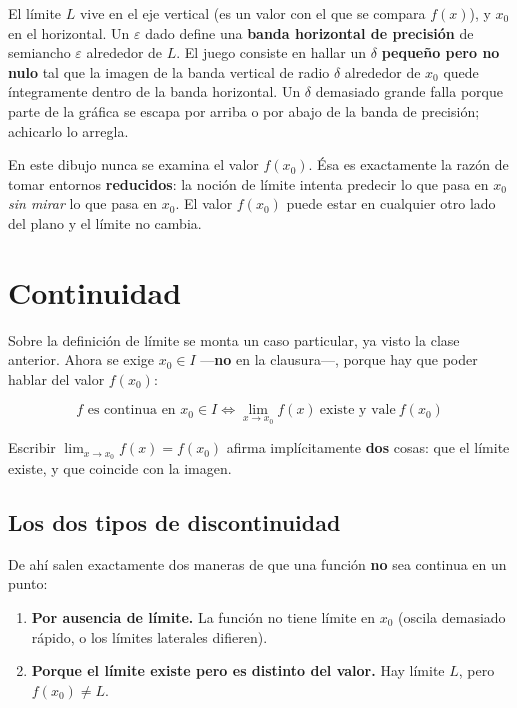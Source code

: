 \documentclass[12pt,a4paper]{article}
\begin{document}
El límite $L$ vive en el eje vertical (es un valor con el que se compara
$f(x)$), y $x_0$ en el horizontal. Un $\varepsilon$ dado define una
\textbf{banda horizontal de precisión} de semiancho $\varepsilon$ alrededor de
$L$. El juego consiste en hallar un $\delta$ \textbf{pequeño pero no nulo} tal
que la imagen de la banda vertical de radio $\delta$ alrededor de $x_0$ quede
íntegramente dentro de la banda horizontal. Un $\delta$ demasiado grande falla
porque parte de la gráfica se escapa por arriba o por abajo de la banda de
precisión; achicarlo lo arregla.



\begin{warnbox}
En este dibujo nunca se examina el valor $f(x_0)$. Ésa es exactamente la razón
de tomar entornos \textbf{reducidos}: la noción de límite intenta predecir lo
que pasa en $x_0$ \emph{sin mirar} lo que pasa en $x_0$. El valor $f(x_0)$
puede estar en cualquier otro lado del plano y el límite no cambia.
\end{warnbox}

\section{Continuidad}

Sobre la definición de límite se monta un caso particular, ya visto la clase
anterior. Ahora se exige $x_0 \in I$ ---\textbf{no} en la clausura---, porque
hay que poder hablar del valor $f(x_0)$:

\begin{keybox}
\[
  \boxed{\ f \text{ es continua en } x_0 \in I
  \iff \lim_{x \to x_0} f(x) \ \text{existe y vale} \ f(x_0)\ }
\]
\end{keybox}

Escribir $\lim_{x\to x_0} f(x) = f(x_0)$ afirma implícitamente \textbf{dos}
cosas: que el límite existe, y que coincide con la imagen.

\subsection{Los dos tipos de discontinuidad}

De ahí salen exactamente dos maneras de que una función \textbf{no} sea
continua en un punto:

\begin{enumerate}[label=\arabic*.]
  \item \textbf{Por ausencia de límite.} La función no tiene límite en $x_0$
        (oscila demasiado rápido, o los límites laterales difieren).
  \item \textbf{Porque el límite existe pero es distinto del valor.} Hay límite
        $L$, pero $f(x_0) \neq L$.
\end{enumerate}
\end{document}
